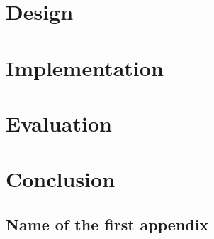 \documentclass{l4proj}
\begin{document}
 
\chapter{Design}
 
 
\chapter{Implementation}
 
 
\chapter{Evaluation}
 
 
\chapter{Conclusion}
 
 
\begin{appendices}
 
\chapter{Name of the first appendix}
 
\end{appendices}
 
 


\end{document}
